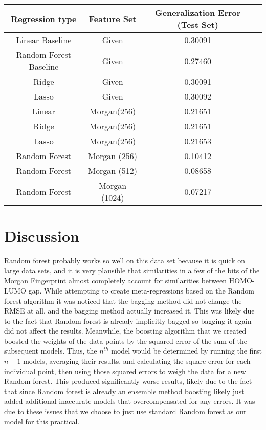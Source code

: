 \documentclass[11pt]{article}
\begin{document}
\begin{center}
\begin{tabular}{|c|c|c|c|}
\hline
Regression type & Feature Set & Generalization Error (Test Set)\\
\hline
Linear Baseline &Given & 0.30091\\
Random Forest Baseline & Given& 0.27460\\
Ridge & Given& 0.30091\\
Lasso &Given& 0.30092\\
Linear&Morgan(256)& 0.21651\\
Ridge&Morgan(256)& 0.21651\\
Lasso&Morgan(256)& 0.21653 \\
Random Forest&Morgan (256)& 0.10412\\
Random Forest&Morgan (512)& 0.08658\\
Random Forest&Morgan (1024)& 0.07217\\
\hline
\end{tabular}
\end{center}



\section{Discussion}
Random forest probably works so well on this data set because it is quick on large data sets, and it is very plausible that similarities in a few of the bits of the Morgan Fingerprint almost completely account for similarities between HOMO-LUMO gap.
While attempting to create meta-regressions based on the Random forest algorithm it was noticed that the bagging method did not change the RMSE at all, and the bagging method actually increased it. This was likely due to the fact that Random forest is already implicitly bagged so bagging it again did not affect the results. Meanwhile, the boosting algorithm that we created boosted the weights of the data points by the squared error of the sum of the subsequent models. Thus, the $n^{th}$ model would be determined by running the first $n-1$ models, averaging their results, and calculating the square error for each individual point, then using those squared errors to weigh the data for a new Random forest. This produced significantly worse results, likely due to the fact that since Random forest is already an ensemble method boosting likely just added additional inaccurate models that overcompensated for any errors. It was due to these issues that we choose to just use standard Random forest as our model for this practical.
\end{document}
